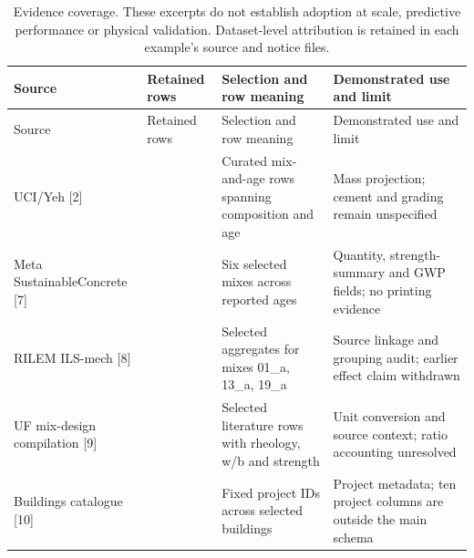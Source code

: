 \documentclass[
  american,
  11pt,
  letterpaper,
]{article}
\begin{document}
\begin{longtable}[]{@{}
  >{\raggedright\arraybackslash}p{}
  >{\raggedleft\arraybackslash}p{}
  >{\raggedright\arraybackslash}p{}
  >{\raggedright\arraybackslash}p{}@{}}
\caption{Evidence coverage. These excerpts do not establish adoption at
scale, predictive performance or physical validation. Dataset-level
attribution is retained in each example's source and notice
files.}\tabularnewline
\toprule\noalign{}
\begin{minipage}[b]{\linewidth}\raggedright
Source
\end{minipage} & \begin{minipage}[b]{\linewidth}\raggedleft
Retained rows
\end{minipage} & \begin{minipage}[b]{\linewidth}\raggedright
Selection and row meaning
\end{minipage} & \begin{minipage}[b]{\linewidth}\raggedright
Demonstrated use and limit
\end{minipage} \\
\midrule\noalign{}
\endfirsthead
\toprule\noalign{}
\begin{minipage}[b]{\linewidth}\raggedright
Source
\end{minipage} & \begin{minipage}[b]{\linewidth}\raggedleft
Retained rows
\end{minipage} & \begin{minipage}[b]{\linewidth}\raggedright
Selection and row meaning
\end{minipage} & \begin{minipage}[b]{\linewidth}\raggedright
Demonstrated use and limit
\end{minipage} \\
\midrule\noalign{}
\endhead
\bottomrule\noalign{}
\endlastfoot
UCI/Yeh {[}2{]} & 14 & Curated mix-and-age rows spanning composition and
age & Mass projection; cement and grading remain unspecified \\
Meta SustainableConcrete {[}7{]} & 28 & Six selected mixes across
reported ages & Quantity, strength-summary and GWP fields; no printing
evidence \\
RILEM ILS-mech {[}8{]} & 9 & Selected aggregates for mixes 01\_a, 13\_a,
19\_a & Source linkage and grouping audit; earlier effect claim
withdrawn \\
UF mix-design compilation {[}9{]} & 10 & Selected literature rows with
rheology, w/b and strength & Unit conversion and source context; ratio
accounting unresolved \\
Buildings catalogue {[}10{]} & 10 & Fixed project IDs across selected
buildings & Project metadata; ten project columns are outside the main
schema \\
\end{longtable}
\end{document}
